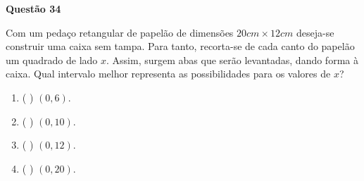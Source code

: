 {\bf Questão 34} 

Com um pedaço retangular de papelão de dimensões $20cm \times 12cm$ deseja-se construir uma caixa sem tampa.
Para tanto, recorta-se de cada canto do papelão um quadrado de lado $x$. Assim, surgem abas que serão
levantadas, dando forma à caixa. Qual intervalo melhor representa as possibilidades para os valores de $x$?
\begin{multicols}{2}
\begin{enumerate}
		\item ( ) $(0,6)$.
		\item ( ) $(0,10)$.
		\item ( ) $(0,12)$.
		\item ( ) $(0,20)$.
		\end{enumerate}
\end{multicols}
